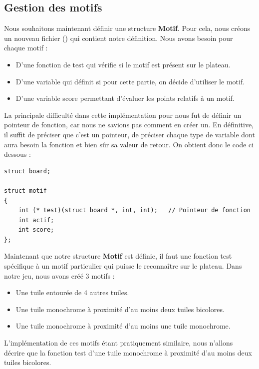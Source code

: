 \documentclass[a4paper]{article}
\begin{document}
\subsection{Gestion des motifs}
Nous souhaitons maintenant définir une structure \textbf{Motif}. Pour cela, nous créons un nouveau fichier () qui contient notre définition.
Nous avons besoin pour chaque motif : 
\begin{itemize}
    \item D'une fonction de test qui vérifie si le motif est présent sur le plateau.
    \item D'une variable qui définit si pour cette partie, on décide d'utiliser le motif.
    \item D'une variable score permettant d'évaluer les points relatifs à un motif. \\
\end{itemize}

La principale difficulté dans cette implémentation pour nous fut de définir un pointeur de fonction, car nous ne savions pas comment en créer un. En définitive, il suffit de préciser que c'est un pointeur, de préciser chaque type de variable dont aura besoin la fonction et bien sûr sa valeur de retour. On obtient donc le code ci dessous :

\begin{lstlisting}
struct board;

struct motif
{
    int (* test)(struct board *, int, int);   // Pointeur de fonction
    int actif;
    int score;  
};
\end{lstlisting}

Maintenant que notre structure \textbf{Motif} est définie, il faut une fonction test spécifique à un motif particulier qui puisse le reconnaître sur le plateau. Dans notre jeu, nous avons créé 3 motifs : 
\begin{itemize}
    \item Une tuile entourée de 4 autres tuiles.
    \item Une tuile monochrome à proximité d'au moins deux tuiles bicolores.
    \item Une tuile monochrome à proximité d'au moins une tuile monochrome. \\
\end{itemize}

L'implémentation de ces motifs étant pratiquement similaire, nous n'allons décrire que la fonction test d'une tuile monochrome à proximité d'au moins deux tuiles bicolores.
\end{document}
